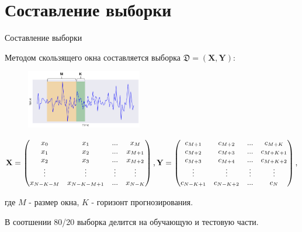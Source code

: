 \documentclass[10pt,pdf,hyperref={unicode}]{beamer}
\begin{document}
\section{Составление выборки}
\begin{frame}{Составление выборки}

Методом скользящего окна составляется выборка $\mathfrak{D}=(\mathbf{X},\mathbf{Y})$:

\begin{figure}[h!t]\center
{\includegraphics[width=0.45\textwidth]{results/slidingwindow.png}}
\end{figure}

\[
\small
\mathbf{X} = 
\begin{pmatrix}
x_{0} & x_{1} & ... & x_{M}\\
x_{1} & x_{2} & ... & x_{M+1} \\
x_{2} & x_{3} & ... & x_{M+2} \\
\vdots & \vdots & \vdots & \vdots \\
x_{N-K-M} & x_{N-K-M+1} & ... & x_{N-K} \\
\end{pmatrix},
\mathbf{Y} = \begin{pmatrix}
c_{M+1} & c_{M+2} & ... & c_{M+K}\\
c_{M+2} & c_{M+3} & ... & c_{M+K+1} \\
c_{M+3} & c_{M+4} & ... & c_{M+K+2} \\
\vdots & \vdots & \vdots & \vdots \\
c_{N-K+1} & c_{N-K+2} & ... & c_{N} \\
\end{pmatrix},
\normalsize
\]

где  $M$ - размер окна, $K$ - горизонт прогнозирования.

\bigskip

В соотшении 80/20 выборка делится на обучающую и тестовую части.

\end{frame}

\end{document}
